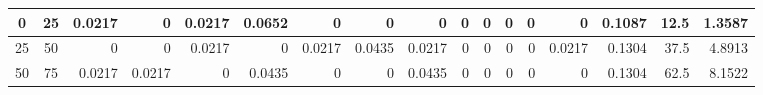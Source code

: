 \begin{table}[ht]
\begin{adjustbox}{width = \textwidth, center}
\begin{tabular}{|cc|r|r|r|r|r|r|r|r|r|r|r|r|r|r|r|}
            \cellcolor[HTML]{D9EAD3}\hspace{7pt}0\hspace{7pt}              & \cellcolor[HTML]{C8E4BE}25             & \cellcolor[HTML]{C7E9D8}0.0217                 & 0                                              & \cellcolor[HTML]{C7E9D8}0.0217                 & \cellcolor[HTML]{57BB8A}0.0652                 & 0                                              & 0                                              & 0                                              & 0                                               & 0                                               & 0                                               & 0                                               & 0                                               & \cellcolor[HTML]{D9D2E9}0.1087                                                  & \cellcolor[HTML]{D9D2E9}12.5                                            & \cellcolor[HTML]{D9D2E9}1.3587                                                        \\ \hline
            \cellcolor[HTML]{D9EAD3}25             & \cellcolor[HTML]{C8E4BE}50             & \cellcolor[HTML]{FFFFFF}0                      & \cellcolor[HTML]{FFFFFF}0                      & \cellcolor[HTML]{C7E9D8}0.0217                 & \cellcolor[HTML]{FFFFFF}0                      & \cellcolor[HTML]{C7E9D8}0.0217                 & \cellcolor[HTML]{8FD2B1}0.0435                 & \cellcolor[HTML]{C7E9D8}0.0217                 & \cellcolor[HTML]{FFFFFF}0                       & \cellcolor[HTML]{FFFFFF}0                       & \cellcolor[HTML]{FFFFFF}0                       & \cellcolor[HTML]{FFFFFF}0                       & \cellcolor[HTML]{C7E9D8}0.0217                  & \cellcolor[HTML]{D9D2E9}0.1304                                                  & \cellcolor[HTML]{D9D2E9}37.5                                            & \cellcolor[HTML]{D9D2E9}4.8913                                                        \\ \hline
            \cellcolor[HTML]{D9EAD3}50             & \cellcolor[HTML]{C8E4BE}75             & \cellcolor[HTML]{C7E9D8}0.0217                 & \cellcolor[HTML]{C7E9D8}0.0217                 & \cellcolor[HTML]{FFFFFF}0                      & \cellcolor[HTML]{8FD2B1}0.0435                 & \cellcolor[HTML]{FFFFFF}0                      & \cellcolor[HTML]{FFFFFF}0                      & \cellcolor[HTML]{8FD2B1}0.0435                 & \cellcolor[HTML]{FFFFFF}0                       & \cellcolor[HTML]{FFFFFF}0                       & \cellcolor[HTML]{FFFFFF}0                       & \cellcolor[HTML]{FFFFFF}0                       & \cellcolor[HTML]{FFFFFF}0                       & \cellcolor[HTML]{D9D2E9}0.1304                                                  & \cellcolor[HTML]{D9D2E9}62.5                                            & \cellcolor[HTML]{D9D2E9}8.1522                                                        \\ \hline

\end{tabular}
\end{adjustbox}
\end{table}
